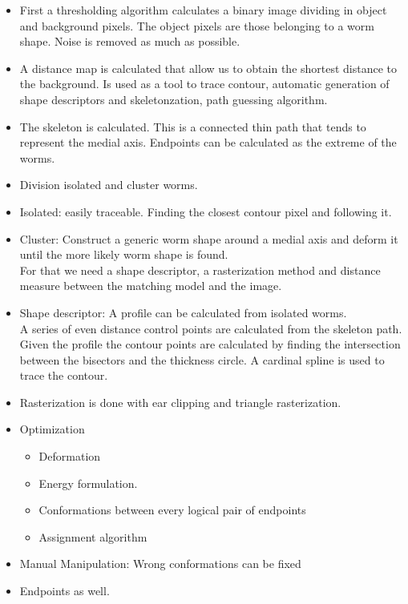 \documentclass[12pt,letterpaper,oneside]{book}
\begin{document}
\begin{itemize}
\item First a thresholding algorithm calculates a binary image dividing
  in object and background pixels. The object pixels are those belonging
  to a worm shape.
  Noise is removed as much as possible.
\item A distance map is calculated that allow us to obtain the shortest
  distance to the background. Is used as a tool
  to trace contour, automatic generation of shape
  descriptors and skeletonzation, path guessing algorithm.
\item The skeleton is calculated. This is a connected thin path that tends
to represent the medial axis. Endpoints can be calculated as the extreme 
of the worms. 
\item Division isolated and cluster worms.
\item Isolated: easily traceable. Finding the 
closest contour pixel and following it.
\item Cluster: Construct a generic worm shape around
a medial axis and deform it until the more likely
worm shape is found.\\ 
For that we need a shape descriptor, a rasterization
method and distance measure between the matching 
model and the image.
\end{itemize}

\begin{itemize}
\item Shape descriptor: A profile can be calculated
from isolated worms.\\
A series of even distance control points are
calculated from the skeleton path. Given the profile
the contour points are calculated by finding the 
intersection between the bisectors and the 
thickness circle. A cardinal spline is used to 
trace the contour.
\item Rasterization is done with ear clipping and
triangle rasterization.
\item Optimization
  \begin{itemize}
  \item Deformation
  \item Energy formulation.
  \item Conformations between every logical 
    pair of endpoints
  \item Assignment algorithm
  \end{itemize}
\end{itemize}

\begin{itemize}
\item Manual Manipulation: Wrong conformations
  can be fixed
\item Endpoints as well.
\end{itemize}
\end{document}
